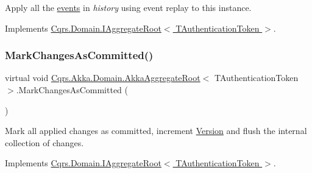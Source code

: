 Apply all the \hyperlink{}{events} in {\itshape history}  using event replay to this instance. 



Implements \hyperlink{interfaceCqrs_1_1Domain_1_1IAggregateRoot_afe9329ee26ae68613059189ca64dfe60_afe9329ee26ae68613059189ca64dfe60}{Cqrs.\+Domain.\+I\+Aggregate\+Root$<$ T\+Authentication\+Token $>$}.

\mbox{\label{classCqrs_1_1Akka_1_1Domain_1_1AkkaAggregateRoot_a0d2615067175e5f8249bb2dc3d17ee0b_a0d2615067175e5f8249bb2dc3d17ee0b}} 
\subsubsection{\texorpdfstring{Mark\+Changes\+As\+Committed()}{MarkChangesAsCommitted()}}
{\footnotesize\ttfamily virtual void \hyperlink{classCqrs_1_1Akka_1_1Domain_1_1AkkaAggregateRoot}{Cqrs.\+Akka.\+Domain.\+Akka\+Aggregate\+Root}$<$ T\+Authentication\+Token $>$.Mark\+Changes\+As\+Committed (\begin{DoxyParamCaption}{ }\end{DoxyParamCaption})\hspace{0.3cm}{\ttfamily [virtual]}}



Mark all applied changes as committed, increment \hyperlink{classCqrs_1_1Akka_1_1Domain_1_1AkkaAggregateRoot_a4b526322c63542b1da2a700ff1b48d0c_a4b526322c63542b1da2a700ff1b48d0c}{Version} and flush the internal collection of changes. 



Implements \hyperlink{interfaceCqrs_1_1Domain_1_1IAggregateRoot_af31116870bbf6566b3eec0b8bc02c6de_af31116870bbf6566b3eec0b8bc02c6de}{Cqrs.\+Domain.\+I\+Aggregate\+Root$<$ T\+Authentication\+Token $>$}.

\mbox{\label{classCqrs_1_1Akka_1_1Domain_1_1AkkaAggregateRoot_a7da2d3a244e34717ec5af1db8f0042bc_a7da2d3a244e34717ec5af1db8f0042bc}} 
